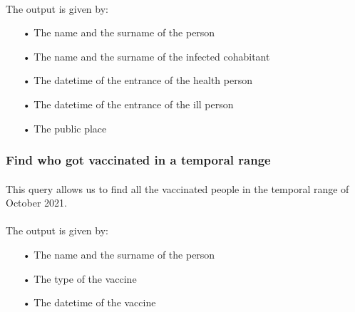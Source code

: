 \documentclass[a4paper,12pt]{article}
\begin{document}
\paragraph{} The output is given by: 
\begin{itemize}
\item[•] The name and the surname of the person
\item[•] The name and the surname of the infected cohabitant
\item[•] The datetime of the entrance of the health person
\item[•] The datetime of the entrance of the ill person
\item[•] The public place
\begin{center}
\end{center}
\end{itemize}

\subsubsection{Find who got vaccinated in a temporal range}
\paragraph{} This query allows us to find all the vaccinated people in the temporal range of October 2021.
\begin{center}
\end{center}
\paragraph{} The output is given by: 
\begin{itemize}
\item[•] The name and the surname of the person
\item[•] The type of the vaccine
\item[•] The datetime of the vaccine
\begin{center}
\end{center}
\end{itemize}
\pagebreak
\end{document}
